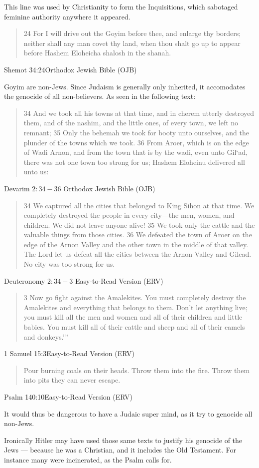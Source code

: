 This line was used by Christianity to form the Inquisitions, which sabotaged
feminine authority anywhere it appeared. 

\blockquote{24 For I will drive out the Goyim before thee, and enlarge thy borders; 
neither shall any man covet thy land, when thou shalt go up to appear before 
Hashem Eloheicha shalosh in the shanah.
}{Shemot 34:24Orthodox Jewish Bible (OJB)}

Goyim are non-Jews.  Since Judaism is generally only inherited, it accomodates 
the genocide of all non-believers. As seen in the following text:

\blockquote{34 And we took all his towns at that time, and in cherem utterly
destroyed them, and of the nashim, and the little ones, of every town, we left
no remnant;
35 Only the behemah we took for booty unto ourselves, and the plunder of the
towns which we took.
36 From Aroer, which is on the edge of Wadi Arnon, and from the town that is by
the wadi, even unto Gil‘ad, there was not one town too strong for us; Hashem
Eloheinu delivered all unto us:
} {Devarim $2:34-36$ Orthodox Jewish Bible (OJB)}

\blockquote{34 We captured all the cities that belonged to King Sihon at that time. We
completely destroyed the people in every city—the men, women, and children. We
did not leave anyone alive! 35 We took only the cattle and the valuable things
from those cities. 36 We defeated the town of Aroer on the edge of the Arnon
Valley and the other town in the middle of that valley. The Lord let us defeat
all the cities between the Arnon Valley and Gilead. No city was too strong for
us. 
}{Deuteronomy $2:34-3$ Easy-to-Read Version (ERV)}

\blockquote{3 Now go fight against the Amalekites. You must completely destroy the
Amalekites and everything that belongs to them. Don’t let anything live; you
must kill all the men and women and all of their children and little babies. You
must kill all of their cattle and sheep and all of their camels and donkeys.’”}
{1 Samuel 15:3Easy-to-Read Version (ERV)}

\blockquote{Pour burning coals on their heads.
    Throw them into the fire.
    Throw them into pits they can never escape.
}{Psalm 140:10Easy-to-Read Version (ERV)}

It would thus be dangerous to have a Judaic super mind, 
as it try to genocide all non-Jews. 

Ironically Hitler may have used those same texts to justify his genocide of the
Jews --- because he was a Christian, and it includes the Old Testament. For
instance many were incinerated, as the Psalm calls for. 

